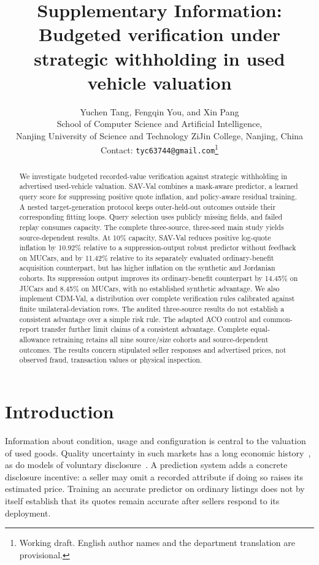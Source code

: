 \documentclass[10pt,journal]{IEEEtran}
\title{Supplementary Information: Budgeted verification under strategic withholding in used vehicle valuation}
\author{Yuchen Tang, Fengqin You, and Xin Pang\\
School of Computer Science and Artificial Intelligence,\\
Nanjing University of Science and Technology ZiJin College, Nanjing, China\\
Contact: \texttt{tyc63744@gmail.com}\thanks{Working draft. English author names and the department translation are provisional.}}
\begin{document}
\maketitle
\begin{abstract}
We investigate
budgeted recorded-value verification against strategic withholding in
advertised used-vehicle valuation. SAV-Val combines a mask-aware predictor,
a learned query score for suppressing positive quote inflation, and
policy-aware residual training. A nested target-generation protocol keeps
outer-held-out outcomes outside their corresponding fitting loops. Query
selection uses publicly missing fields, and failed replay consumes capacity.
The complete three-source, three-seed main study yields source-dependent
results. At 10\% capacity, SAV-Val reduces positive log-quote inflation
by 10.92\% relative to a suppression-output robust predictor without feedback
on MUCars, and by 11.42\% relative to its separately evaluated ordinary-benefit
acquisition counterpart,
but has higher inflation on the synthetic and Jordanian cohorts. Its
suppression output improves its ordinary-benefit counterpart by 14.45\%
on JUCars and 8.45\% on MUCars, with no established synthetic advantage.
We also implement CDM-Val, a distribution over complete verification
rules calibrated against finite unilateral-deviation rows. The audited
three-source results do not establish a consistent advantage
over a simple risk rule. The adapted ACO control and common-report transfer
further limit claims of a consistent advantage. Complete equal-allowance
retraining retains all nine source/size cohorts and source-dependent outcomes.
The results concern stipulated seller responses and advertised prices,
not observed fraud, transaction values or physical inspection.
\end{abstract}
\section{Introduction}
Information about condition, usage and configuration is central to the
valuation of used goods. Quality uncertainty in such markets has a long
economic history~\cite{akerlof1970lemons}, as do models of voluntary
disclosure~\cite{grossman1981disclosure,milgrom1981news}. A prediction system
adds a concrete disclosure incentive: a seller may omit a recorded attribute
if doing so raises its estimated price. Training an accurate predictor on
ordinary listings does not by itself establish that its quotes remain
accurate after sellers respond to its deployment.
\end{document}
